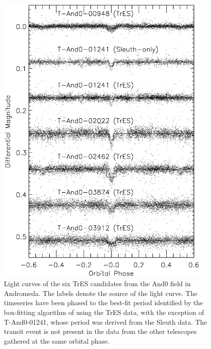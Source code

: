 \begin{figure}
\begin{center}
\includegraphics[width=0.95\textwidth]{2_f3}
\caption[TrES light curves of the six candidates from the And0 field]{Light curves of the six TrES candidates from the And0 field in Andromeda. The labels denote the source of the light curve. The timeseries have been phased to the best-fit period identified by the box-fitting algorithm of \citet{Kovacs_Zucker_Mazeh:aa:2002a} using the TrES data, with the exception of \mbox{T-And0-01241}, whose period was derived from the Sleuth data. The transit event is not present in the data from the other telescopes gathered at the same orbital phase.}\label{cha:and0:fig:tresCand}
\end{center}
\end{figure}

